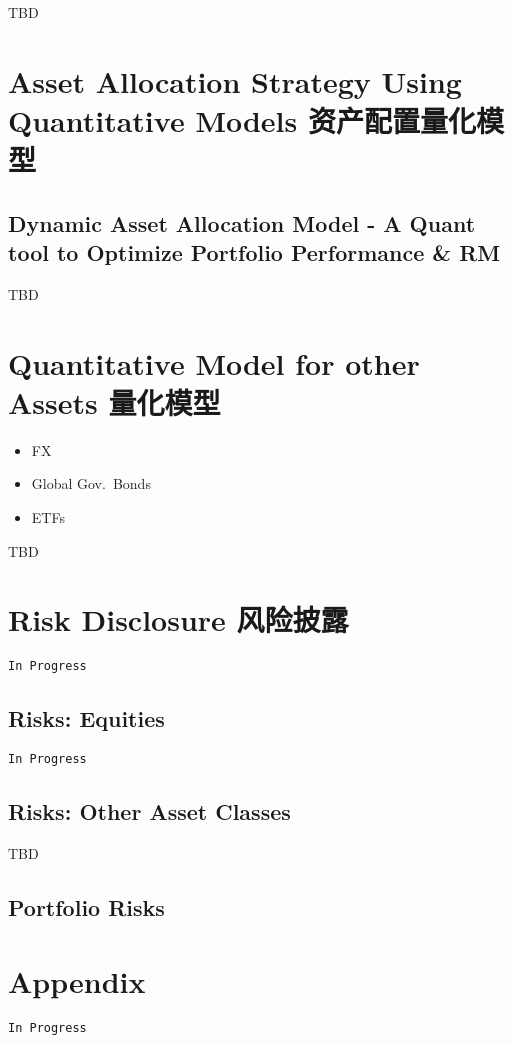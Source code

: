 \documentclass[
]{book}
\begin{document}
TBD

\hypertarget{asset-allocation-strategy-using-quantitative-models-ux8d44ux4ea7ux914dux7f6eux91cfux5316ux6a21ux578b}{%
\chapter{Asset Allocation Strategy Using Quantitative Models
资产配置量化模型}\label{asset-allocation-strategy-using-quantitative-models-ux8d44ux4ea7ux914dux7f6eux91cfux5316ux6a21ux578b}}

\hypertarget{dynamic-asset-allocation-model---a-quant-tool-to-optimize-portfolio-performance-rm}{%
\section{Dynamic Asset Allocation Model - A Quant tool to Optimize
Portfolio Performance \&
RM}\label{dynamic-asset-allocation-model---a-quant-tool-to-optimize-portfolio-performance-rm}}

TBD

\hypertarget{quantitative-model-for-other-assets-ux91cfux5316ux6a21ux578b}{%
\chapter{Quantitative Model for other Assets
量化模型}\label{quantitative-model-for-other-assets-ux91cfux5316ux6a21ux578b}}

\begin{itemize}
\item
  FX
\item
  Global Gov.~Bonds
\item
  ETFs
\end{itemize}

TBD

\hypertarget{risk-disclosure-ux98ceux9669ux62abux9732}{%
\chapter{Risk Disclosure
风险披露}\label{risk-disclosure-ux98ceux9669ux62abux9732}}

\texttt{In\ Progress}

\hypertarget{risks-equities}{%
\section{Risks: Equities}\label{risks-equities}}

\texttt{In\ Progress}

\hypertarget{risks-other-asset-classes}{%
\section{Risks: Other Asset Classes}\label{risks-other-asset-classes}}

TBD

\hypertarget{portfolio-risks}{%
\section{Portfolio Risks}\label{portfolio-risks}}

\hypertarget{appendix}{%
\chapter{Appendix}\label{appendix}}

\texttt{In\ Progress}

\backmatter
\end{document}
